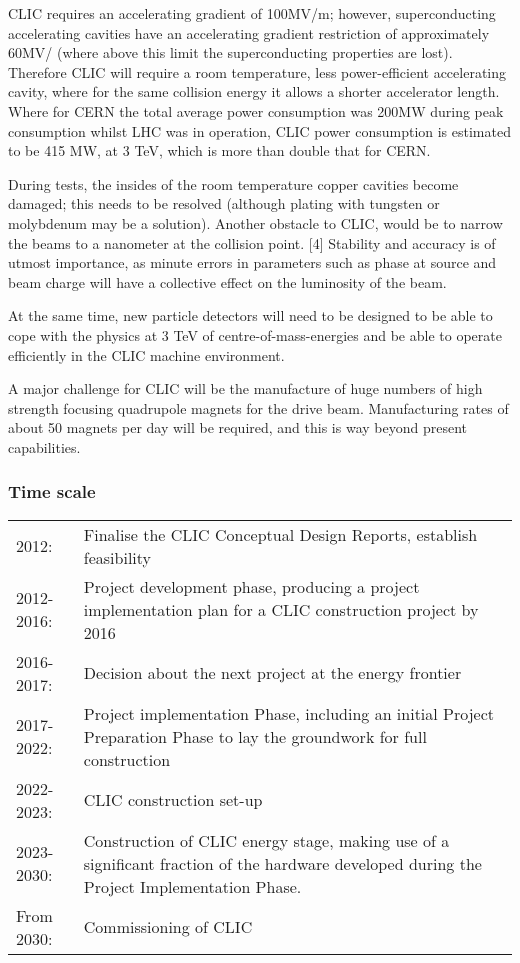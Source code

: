 CLIC requires an accelerating gradient of 100MV/m; however, superconducting accelerating cavities have an accelerating gradient restriction of approximately 60MV/ (where above this limit the superconducting properties are lost). Therefore CLIC will require a room temperature, less power-efficient accelerating cavity, where for the same collision energy it allows a shorter accelerator length. Where for CERN the total average power consumption was 200MW during peak consumption whilst LHC was in operation, CLIC power consumption is estimated to be 415 MW, at 3 TeV, which is more than double that for CERN. \cite{CERN:Powering}

During tests, the insides of the room temperature copper cavities become damaged; this needs to be resolved (although plating with tungsten or molybdenum may be a solution). Another obstacle to CLIC, would be to narrow the beams to a nanometer at the collision point. [4] Stability and accuracy is of utmost importance, as minute errors in parameters such as phase at source and beam charge will have a collective effect on the luminosity of the beam. \cite{CLIC:DriveBeam}

At the same time, new particle detectors will need to be designed to be able to cope with the physics at 3 TeV of centre-of-mass-energies and be able to operate efficiently in the CLIC machine environment. \cite{CLIC:Concept}

A major challenge for CLIC will be the manufacture of huge numbers of high strength focusing quadrupole magnets for the drive beam. Manufacturing rates of about 50 magnets per day will be required, and this is way beyond present capabilities. \cite{CLIC:STFC}
 
\subsubsection{Time scale}

\begin{tabular}{p{2cm} p{12cm}}

2012: & Finalise the CLIC Conceptual Design Reports, establish feasibility \\
2012-2016: & Project development phase, producing a project implementation plan for a CLIC construction project by 2016 \\
2016-2017: & Decision about the next project at the energy frontier \\
2017-2022: & Project implementation Phase, including an initial Project Preparation Phase to lay the groundwork for full construction \\
2022-2023: & CLIC construction set-up \\
2023-2030: & Construction of CLIC energy stage, making use of a significant fraction of the hardware developed during the Project Implementation Phase. \\
From 2030: & Commissioning of CLIC \\

\end{tabular}


